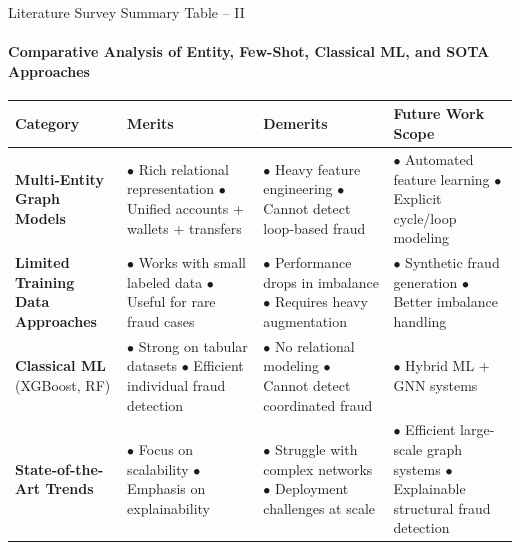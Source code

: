 \documentclass[aspectratio=169, 11pt]{beamer}
\begin{document}
\begin{frame}{Literature Survey Summary Table -- II}
    \framesubtitle{Comparative Analysis of Entity, Few-Shot, Classical ML, and SOTA Approaches}
    \vspace{-0.35cm}
    \centering
    \renewcommand{\arraystretch}{0.95}
    \scriptsize
    \begin{tabularx}{\textwidth}{p{2.6cm} p{3.4cm} p{3.2cm} X}
        \toprule
        \textbf{Category} & \textbf{Merits} & \textbf{Demerits} & \textbf{Future Work Scope} \\
        \midrule
        \textbf{Multi-Entity Graph Models} &
        $\bullet$ Rich relational representation \newline
        $\bullet$ Unified accounts + wallets + transfers &
        $\bullet$ Heavy feature engineering \newline
        $\bullet$ Cannot detect loop-based fraud &
        $\bullet$ Automated feature learning \newline
        $\bullet$ Explicit cycle/loop modeling \\
        \addlinespace[2pt]
        \textbf{Limited Training Data Approaches} &
        $\bullet$ Works with small labeled data \newline
        $\bullet$ Useful for rare fraud cases &
        $\bullet$ Performance drops in imbalance \newline
        $\bullet$ Requires heavy augmentation &
        $\bullet$ Synthetic fraud generation \newline
        $\bullet$ Better imbalance handling \\
        \addlinespace[2pt]
        \textbf{Classical ML} \newline (XGBoost, RF) &
        $\bullet$ Strong on tabular datasets \newline
        $\bullet$ Efficient individual fraud detection &
        $\bullet$ No relational modeling \newline
        $\bullet$ Cannot detect coordinated fraud &
        $\bullet$ Hybrid ML + GNN systems \\
        \addlinespace[2pt]
        \textbf{State-of-the-Art Trends} &
        $\bullet$ Focus on scalability \newline
        $\bullet$ Emphasis on explainability &
        $\bullet$ Struggle with complex networks \newline
        $\bullet$ Deployment challenges at scale &
        $\bullet$ Efficient large-scale graph systems \newline
        $\bullet$ Explainable structural fraud detection \\
        \bottomrule
    \end{tabularx}
\end{frame}
\end{document}
